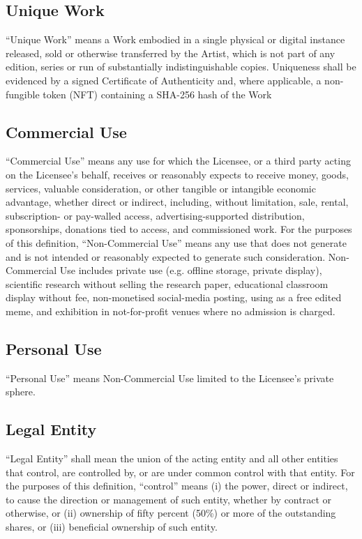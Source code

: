 \subsection{Unique Work}
\enquote{Unique Work} means a Work embodied in a single physical or digital 
instance released, sold or otherwise transferred by the Artist, which is not 
part of any edition, series or run of substantially indistinguishable copies.
Uniqueness shall be evidenced by a signed Certificate of Authenticity
and, where applicable, a non-fungible token (NFT) containing a SHA-256 hash
of the Work


\subsection{Commercial Use}
\enquote{Commercial Use} means any use for which the Licensee, or a third 
party acting on the Licensee's behalf, receives or reasonably expects to receive 
money, goods, services, valuable consideration, or other tangible or intangible 
economic advantage, whether direct or indirect, including, without limitation, 
sale, rental, subscription- or pay-walled access, advertising-supported 
distribution, sponsorships, donations tied to access, and commissioned work.
For the purposes of this definition, \enquote{Non-Commercial Use} means any use 
that does not generate and is not intended or reasonably expected to generate 
such consideration.
Non-Commercial Use includes private use (e.g. offline storage, private display), 
scientific research without selling the research paper, educational classroom 
display without fee, non-monetised social-media posting, using as a free edited 
meme, and exhibition in not-for-profit venues where no admission is charged.


\subsection{Personal Use}
\enquote{Personal Use} means Non-Commercial Use limited to the Licensee's 
private sphere.


\subsection{Legal Entity}
\enquote{Legal Entity} shall mean the union of the acting entity and all other 
entities that control, are controlled by, or are under common control with that 
entity.
For the purposes of this definition, \enquote{control} means 
(i) the power, direct or indirect, to cause the direction or management of such 
entity, whether by contract or otherwise, or 
(ii) ownership of fifty percent (50\%) or more of the outstanding shares, or 
(iii) beneficial ownership of such entity.



